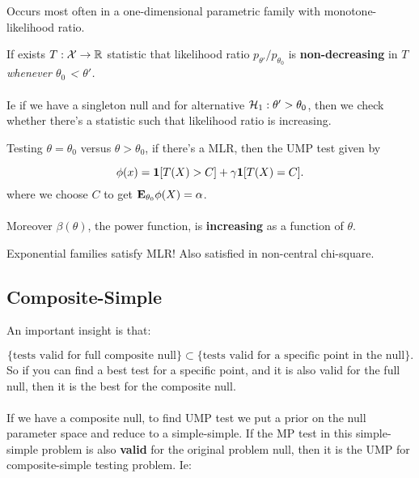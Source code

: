 \documentclass{article}
\begin{document}
 Occurs most often in a one-dimensional parametric family with monotone-likelihood ratio. 
\begin{definition}
If exists $T: \cal X \to \mathbb R$ statistic that likelihood ratio $p_{\theta'}/p_{\theta_0}$ is \textbf{non-decreasing} in $T$ \textit{whenever $\theta_0$ < $\theta'$. } \\\\
Ie if we have a singleton null and for alternative $\mathcal H_1: \theta'> \theta_0$, then we check whether there's a statistic such that likelihood ratio is increasing.  
\end{definition}


\begin{theorem}
Testing $\theta = \theta_0$ versus $\theta>\theta_0$, if there's a MLR, then the UMP test given by

$$\phi(x) = \boldsymbol{1}[T(X) > C ] + \gamma \boldsymbol{1}[T(X) = C].$$
where we choose $C$ to get $\mathbf{E}_{\theta_0} \phi(X) = \alpha$. \\ \\

Moreover $\beta(\theta)$, the power function, is \textbf{increasing} as a function of $\theta$.  
\end{theorem}
\begin{fact}
Exponential families satisfy MLR! Also satisfied in non-central chi-square.
\end{fact}



\subsection{Composite-Simple}



An important insight is that:

$$\{ \text{tests valid for full composite null} \} \subset \{ \text{tests valid for a specific point in the null}\}.$$
So if you can find a best test for a specific point, and it is also valid for the full null, then it is the best for the composite null. \\\\

If we have a composite null, to find UMP test we put a prior on the null parameter space and reduce to a simple-simple. If the MP test in this simple-simple problem is also \textbf{valid} for the original problem null, then it is the UMP for composite-simple testing problem. Ie:
\end{document}
